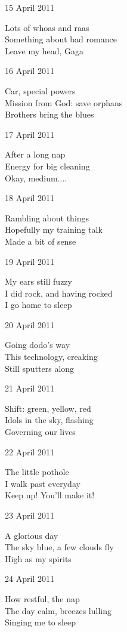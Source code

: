 \documentclass[12pt]{article}
\begin{document}
15 April 2011

Lots of whoas and raas \\
Something about bad romance \\
Leave my head, Gaga

16 April 2011

Car, special powers \\
Mission from God: save orphans \\
Brothers bring the blues

\newpage

17 April 2011

After a long nap \\
Energy for big cleaning \\
Okay, medium....

18 April 2011

Rambling about things \\
Hopefully my training talk \\
Made a bit of sense

19 April 2011

My ears still fuzzy \\
I did rock, and having rocked \\
I go home to sleep

20 April 2011

Going dodo's way \\
This technology, creaking \\
Still sputters along

21 April 2011

Shift: green, yellow, red \\
Idols in the sky, flashing \\
Governing our lives

22 April 2011

The little pothole \\
I walk past everyday \\
Keep up! You'll make it!

23 April 2011

A glorious day \\
The sky blue, a few clouds fly \\
High as my spirits

\newpage

24 April 2011

How restful, the nap  \\
The day calm, breezes lulling \\
Singing me to sleep
\end{document}

